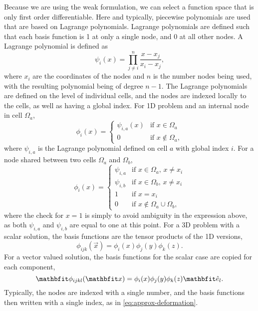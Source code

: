 Because we are using the weak formulation, we can select a function space that is only first order differentiable.
Here and typically, piecewise polynomials are used that are based on Lagrange polynomials.
Lagrange polynomials are defined such that each basis function is 1 at only a single node, and 0 at all other nodes.
A Lagrange polynomial is defined as
\begin{equation}
    \psi_{i}(x) = \prod_{j \neq i}^{n} \frac{x - x_{j}}{x_{i} - x_{j}},
\end{equation}
where $x_i$ are the coordinates of the nodes and $n$ is the number nodes being used, with the resulting polynomial being of degree $n - 1$.
The Lagrange polynomials are defined on the level of individual cells, and the nodes are indexed locally to the cells, as well as having a global index.
For 1D problem and an internal node in cell $\Omega_{a}$,
\begin{equation}
    \phi_{i}(x) =
    \begin{cases}
        \psi_{i, a}(x) & \textrm{if } x \in \Omega_{a}\\
        0 & \textrm{if } x \notin \Omega_{a},
    \end{cases}
\end{equation}
where $\psi_{i, a}$ is the Lagrange polynomial defined on cell $a$ with global index $i$.
For a node shared between two cells $\Omega_{a}$ and $\Omega_{b}$,
\begin{equation}
    \phi_{i}(x) =
    \begin{cases}
        \psi_{i, a} & \textrm{if } x \in \Omega_{a} \textrm{, } x \neq x_{i}\\
        \psi_{i, b} & \textrm{if } x \in \Omega_{b} \textrm{, } x \neq x_{i}\\
        1 & \textrm{if } x = x_{i}\\
        0 & \textrm{if } x \notin \Omega_{a} \cup \Omega_{b},
    \end{cases}
\end{equation}
where the check for $x = 1$ is simply to avoid ambiguity in the expression above, as both $\psi_{i, a}$ and $\psi_{i, b}$ are equal to one at this point.
For a 3D problem with a scalar solution, the basis functions are the tensor products of the 1D versions,
\begin{equation}
    \phi_{ijk}(\vec{x}) = \phi_{i}(x) \phi_{j}(y) \phi_{k}(z).
\end{equation}
For a vector valued solution, the basis functions for the scalar case are copied for each component,
\begin{equation}
    \vec{\phi}_{ijkl}(\vec{x}) = \phi_{i}(x) \phi_{j}(y) \phi_{k}(z) \unitvec_{l}.
\end{equation}
Typically, the nodes are indexed with a single number, and the basis functions then written with a single index, as in \cref{eq:approx-deformation}.
    
